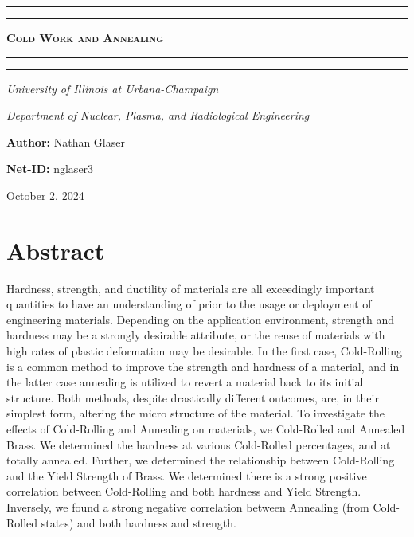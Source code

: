 \documentclass{article}
\begin{document}
\newcommand{\Fig}[3]{\begin{figure}[!h!]\centering\texttt{[image: \#1]}\caption{#2}\label{#3}\end{figure}}
\begin{titlepage}

\centering
\scshape
\vspace{\baselineskip}

%
\rule{\textwidth}{1.6pt}\vspace*{-\baselineskip}\vspace*{2pt}
\rule{\textwidth}{0.4pt}

{\Huge \textbf{\textsc{ Cold Work and Annealing \\
\vspace{15pt}}}}

\rule{\textwidth}{0.4pt}\vspace*{-\baselineskip}\vspace{3.2pt}
\rule{\textwidth}{1.6pt}\vspace{6pt}
\centerline{\textit{University of Illinois at Urbana-Champaign}} 
\centerline{\textit{Department of Nuclear, Plasma, and Radiological Engineering}}
\vspace{1.5\baselineskip}


\large \centerline{\textbf{Author:} Nathan Glaser}
\large \centerline{\textbf{Net-ID:} nglaser3}
\quad

\vfill
\large \centerline{October 2, 2024}
%
\end{titlepage}

\tableofcontents
\newpage
{}
 
\section{Abstract}
Hardness, strength, and ductility of materials are all exceedingly important quantities to have an understanding of prior to the usage or deployment of engineering materials. Depending on the application environment, strength and hardness may be a strongly desirable attribute, or the reuse of materials with high rates of plastic deformation may be desirable. In the first case, Cold-Rolling is a common method to improve the strength and hardness of a material, and in the latter case annealing is utilized to revert a material back to its initial structure. Both methods, despite drastically different outcomes, are, in their simplest form, altering the micro structure of the material. To investigate the effects of Cold-Rolling and Annealing on materials, we Cold-Rolled and Annealed Brass. We determined the hardness at various Cold-Rolled percentages, and at totally annealed. Further, we determined the relationship between Cold-Rolling and the Yield Strength of Brass. We determined there is a strong positive correlation between Cold-Rolling and both hardness and Yield Strength. Inversely, we found a strong negative correlation between Annealing (from Cold-Rolled states) and both hardness and strength.
\end{document}
